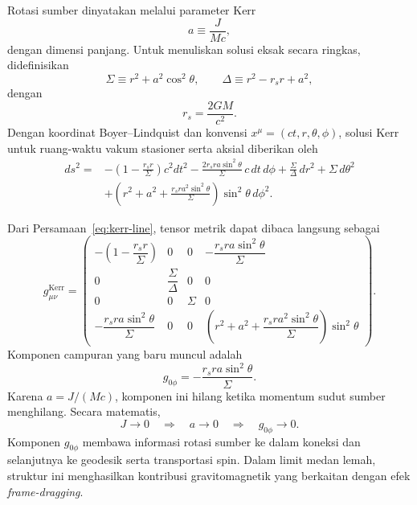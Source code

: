 Rotasi sumber dinyatakan melalui parameter Kerr
\begin{equation}
    a\equiv\frac{J}{Mc},
    \label{eq:kerr-a}
\end{equation}
dengan dimensi panjang. Untuk menuliskan solusi eksak secara ringkas,
didefinisikan
\begin{equation}
    \Sigma\equiv r^2+a^2\cos^2\!\theta,
    \qquad
    \Delta\equiv r^2-r_sr+a^2,
    \label{eq:sigma-delta}
\end{equation}
dengan
\begin{equation}
    r_s=\frac{2GM}{c^2}.
\end{equation}
Dengan koordinat Boyer--Lindquist dan konvensi
$x^\mu=(ct,r,\theta,\phi)$, solusi Kerr untuk ruang-waktu vakum stasioner
serta aksial diberikan oleh \parencite{Kerr1963KerrMetric,Carroll2004SpacetimeGeometry}
\begin{equation}
\begin{split}
    ds^2={}&-\left(1-\frac{r_sr}{\Sigma}\right)c^2dt^2
    -\frac{2r_sra\sin^2\!\theta}{\Sigma}\,c\,dt\,d\phi
    +\frac{\Sigma}{\Delta}\,dr^2
    +\Sigma\,d\theta^2 \\
    &+\left(
        r^2+a^2+
        \frac{r_sra^2\sin^2\!\theta}{\Sigma}
    \right)\sin^2\!\theta\,d\phi^2.
    \label{eq:kerr-line}
\end{split}
\end{equation}

Dari Persamaan~\eqref{eq:kerr-line}, tensor metrik dapat dibaca langsung
sebagai
\begin{equation}
    g_{\mu\nu}^{\mathrm{Kerr}}=
    \begin{pmatrix}
        -\left(1-\dfrac{r_sr}{\Sigma}\right)
        &0&0
        &-\dfrac{r_sra\sin^2\!\theta}{\Sigma}
        \\[12pt]
        0&\dfrac{\Sigma}{\Delta}&0&0
        \\[12pt]
        0&0&\Sigma&0
        \\[12pt]
        -\dfrac{r_sra\sin^2\!\theta}{\Sigma}
        &0&0
        &\left(
            r^2+a^2+
            \dfrac{r_sra^2\sin^2\!\theta}{\Sigma}
        \right)\sin^2\!\theta
    \end{pmatrix}.
    \label{eq:kerr-matrix}
\end{equation}
Komponen campuran yang baru muncul adalah
\begin{equation}
    g_{0\phi}
    =-\frac{r_sra\sin^2\!\theta}{\Sigma}.
    \label{eq:kerr-gtphi}
\end{equation}
Karena $a=J/(Mc)$, komponen ini hilang ketika momentum sudut sumber
menghilang. Secara matematis,
\begin{equation}
    J\rightarrow0
    \quad\Longrightarrow\quad
    a\rightarrow0
    \quad\Longrightarrow\quad
    g_{0\phi}\rightarrow0.
    \label{eq:kerr-rotation-chain}
\end{equation}
Komponen $g_{0\phi}$ membawa informasi rotasi sumber ke dalam koneksi dan
selanjutnya ke geodesik serta transportasi spin. Dalam limit medan lemah,
struktur ini menghasilkan kontribusi gravitomagnetik yang berkaitan dengan
efek \textit{frame-dragging}.

